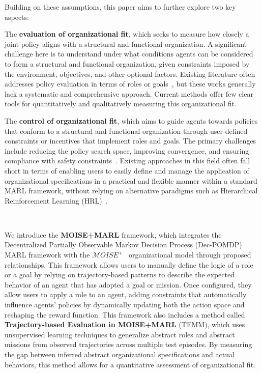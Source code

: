 \documentclass[conference]{IEEEtran}
\begin{document}
Building on these assumptions, this paper aims to further explore two key aspects:
\begin{enumerate*}[label={\roman*)}]
    \item The \textbf{evaluation of organizational fit}, which seeks to measure how closely a joint policy aligns with a structural and functional organization. 
    A significant challenge here is to understand under what conditions agents can be considered to form a structural and functional organization, given constraints imposed by the environment, objectives, and other optional factors.
    Existing literature often addresses policy evaluation in terms of roles or goals~\cite{yang2021role, foerster2018communication}, but these works generally lack a systematic and comprehensive approach. 
    Current methods offer few clear tools for quantitatively and qualitatively measuring this organizational fit.
    
    \item The \textbf{control of organizational fit}, which aims to guide agents towards policies that conform to a structural and functional organization through user-defined constraints or incentives that implement roles and goals.
    The primary challenges include reducing the policy search space, improving convergence, and ensuring compliance with safety constraints~\cite{borsa2019constrained, garcia2015comprehensive}.
    Existing approaches in this field often fall short in terms of enabling users to easily define and manage the application of organizational specifications in a practical and flexible manner within a standard MARL framework, without relying on alternative paradigms such as Hierarchical Reinforcement Learning (HRL)~\cite{ghavamzadeh2006cooperative, hi_marl_reference}.
\end{enumerate*}

\

\noindent We introduce the \textbf{MOISE+MARL} framework, which integrates the Decentralized Partially Observable Markov Decision Process (Dec-POMDP) MARL framework with the $\mathcal{M}OISE^+$~\cite{Hubner2007} organizational model through proposed relationships. 
This framework allows users to manually define the logic of a role or a goal by relying on trajectory-based patterns to describe the expected behavior of an agent that has adopted a goal or mission. 
Once configured, they allow users to apply a role to an agent, adding constraints that automatically influence agents' policies by dynamically updating both the action space and reshaping the reward function.
This framework also includes a method called \textbf{Trajectory-based Evaluation in MOISE+MARL} (TEMM), which uses unsupervised learning techniques to generalize abstract roles and abstract missions from observed trajectories across multiple test episodes. 
By measuring the gap between inferred abstract organizational specifications and actual behaviors, this method allows for a quantitative assessment of organizational fit.
\end{document}

